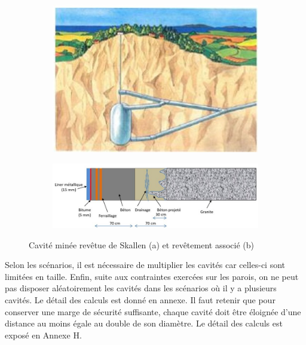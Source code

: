 \documentclass[11pt,french,a4paper]{article}
\begin{document}
\begin{figure}[h]
  \centering
  \begin{subfigure}[b]{0.4\linewidth}
    \includegraphics[width=\linewidth]{image/chap2/cav_skallen.jpg}
    \caption{ }
  \end{subfigure}
  \begin{subfigure}[b]{0.43\linewidth}
    \includegraphics[width=\linewidth]{image/chap2/crea_cav_min.jpg}
    \caption{ }
  \end{subfigure}
  \caption{Cavité minée revêtue de Skallen (a) et revêtement associé (b)}
\end{figure}

Selon les scénarios, il est nécessaire de multiplier les cavités car celles-ci sont limitées en taille. Enfin, suite aux contraintes exercées sur les parois, on ne peut pas disposer aléatoirement les cavités dans les scénarios où il y a plusieurs cavités. Le détail des calculs est donné en annexe. Il faut retenir que pour conserver une marge de sécurité suffisante, chaque cavité doit être éloignée d’une distance au moins égale au double de son diamètre. Le détail des calculs est exposé en Annexe H.
\end{document}
